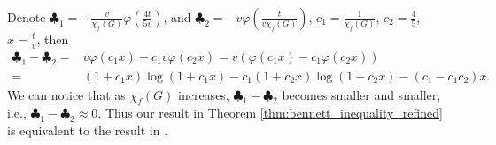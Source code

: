 \documentclass{article}
\def\vx{{\mathbf{x}}}
\def\mX{{\mathbf{X}}}
\def\defeq{\overset{\textup{def}}{=}}
\newtheorem{theorem}{Theorem}
\begin{document}
\begin{enumerate}[(1)]
Denote $\clubsuit _1 = -\frac{v}{\chi _f(G)} \varphi (\frac{4t}{5v}) $, and $ \clubsuit _2 = -v \varphi (\frac{t}{v \chi _f(G)}) $, $c_1 = \frac{1}{\chi _f(G)}$, $c_2 = \frac{4}{5}$, $x = \frac{t}{v}$, then
\begin{align*}
    \clubsuit_1 - \clubsuit _2 
    = &  v \varphi (c_1 x) - c_1 v \varphi (c_2 x) 
    =  v (\varphi (c_1 x) - c_1 \varphi(c_2 x) ) \\ 
    = & (1 +c_1 x)\log (1+c_1 x)   -  c_1(1 +c_2x) \log (1+ c_2 x) - (c_1 - c_1 c_2)x.
\end{align*}
We can notice that as $\chi _f(G)$ increases, $\clubsuit _1 - \clubsuit_2 $ becomes smaller and smaller, i.e., $\clubsuit _1 - \clubsuit _2 \approx 0 $. Thus our result in Theorem \ref{thm:bennett_inequality_refined} is equivalent to the result in \cite{ralaivola2015entropy}. 

\end{enumerate}


\end{document}
